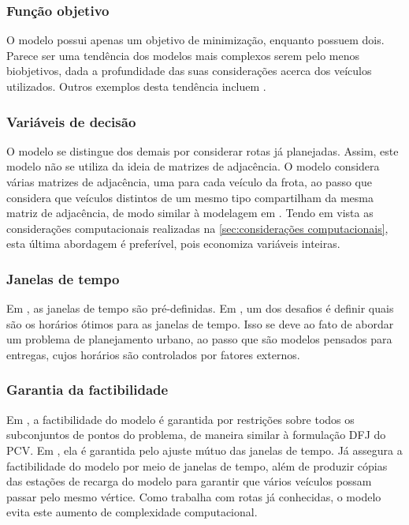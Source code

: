 \subsubsection*{Função objetivo}
O modelo \cite{VIEIRA:13} possui apenas um objetivo de minimização, enquanto \cite{FÜGENSCHUH:04,HIERMANN:16} possuem dois. Parece ser uma tendência dos modelos mais complexos serem pelo menos biobjetivos, dada a profundidade das suas considerações acerca dos veículos utilizados. Outros exemplos desta tendência incluem \cite{KESKIN:18,CATALDO:22,FROGER:17,ZUO:19,ZHANG:21}.

\subsubsection*{Variáveis de decisão}
O modelo \cite{FÜGENSCHUH:04} se distingue dos demais por considerar rotas já planejadas. Assim, este modelo não se utiliza da ideia de matrizes de adjacência. O modelo \cite{VIEIRA:13} considera várias matrizes de adjacência, uma para cada veículo da frota, ao passo que \cite{HIERMANN:16} considera que veículos distintos de um mesmo tipo compartilham da mesma matriz de adjacência, de modo similar à modelagem em \cite{ACHUTHAN:96}. Tendo em vista as considerações computacionais realizadas na \cref{sec:considerações computacionais}, esta última abordagem é preferível, pois economiza variáveis inteiras.

\subsubsection*{Janelas de tempo}
Em \cite{VIEIRA:13,HIERMANN:16}, as janelas de tempo são pré-definidas. Em \cite{FÜGENSCHUH:04}, um dos desafios é definir quais são os horários ótimos para as janelas de tempo. Isso se deve ao fato de \cite{FÜGENSCHUH:04} abordar um problema de planejamento urbano, ao passo que \cite{VIEIRA:13,HIERMANN:16} são modelos pensados para entregas, cujos horários são controlados por fatores externos.

\subsubsection*{Garantia da factibilidade}
Em \cite{VIEIRA:13}, a factibilidade do modelo é garantida por restrições sobre todos os subconjuntos de pontos do problema, de maneira similar à formulação DFJ do PCV. Em \cite{FÜGENSCHUH:04}, ela é garantida pelo ajuste mútuo das janelas de tempo. Já \cite{HIERMANN:16} assegura a factibilidade do modelo por meio de janelas de tempo, além de produzir cópias das estações de recarga do modelo para garantir que vários veículos possam passar pelo mesmo vértice. Como \cite{FÜGENSCHUH:04} trabalha com rotas já conhecidas, o modelo evita este aumento de complexidade computacional.